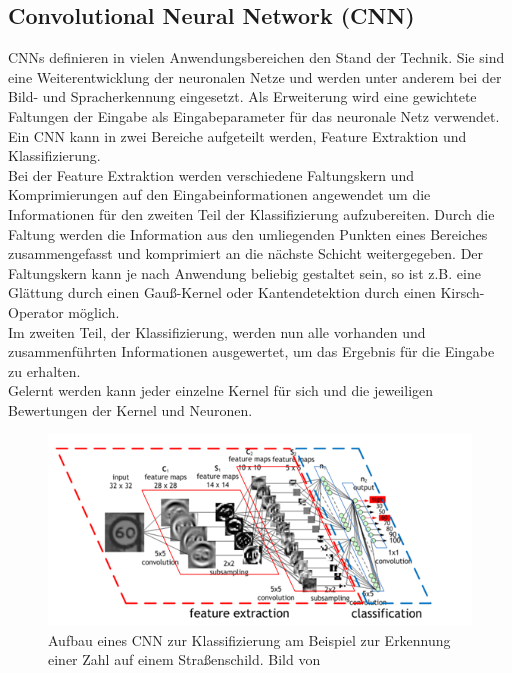 \subsection{Convolutional Neural Network (CNN)}
CNNs definieren in vielen Anwendungsbereichen den Stand der Technik. Sie sind eine Weiterentwicklung der neuronalen Netze und werden unter anderem bei der Bild- und Spracherkennung eingesetzt. Als Erweiterung wird eine gewichtete Faltungen der Eingabe als Eingabeparameter für das neuronale Netz verwendet.\\
Ein CNN kann in zwei Bereiche aufgeteilt werden, Feature Extraktion und Klassifizierung.\\
Bei der Feature Extraktion werden verschiedene Faltungskern und Komprimierungen auf den Eingabeinformationen angewendet um die Informationen für den zweiten Teil der Klassifizierung aufzubereiten. Durch die Faltung werden die Information aus den umliegenden Punkten eines Bereiches zusammengefasst und komprimiert an die nächste Schicht weitergegeben. Der Faltungskern kann je nach Anwendung beliebig gestaltet sein, so ist z.B. eine Glättung durch einen Gauß-Kernel oder Kantendetektion durch einen Kirsch-Operator möglich.\\
Im zweiten Teil, der Klassifizierung, werden nun alle vorhanden und zusammenführten Informationen ausgewertet, um das Ergebnis für die Eingabe zu erhalten.\\
Gelernt werden kann jeder einzelne Kernel für sich und die jeweiligen Bewertungen der Kernel und Neuronen.
\cite{pdf_CNN}\cite{wiki_CNN}
\begin{figure}
	\centering
	\includegraphics[width=0.9\linewidth]{img/cnn}
	\caption{Aufbau eines CNN zur Klassifizierung am Beispiel zur Erkennung einer Zahl auf einem Straßenschild. Bild von \cite{bild_CNN}}
	\label{img_cnn}
\end{figure}
\newpage
